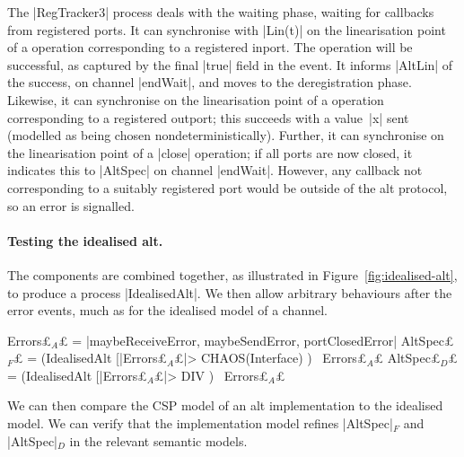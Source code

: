 
The |RegTracker3| process %
deals with the
waiting phase, waiting for callbacks from registered ports.  It can
synchronise with |Lin(t)| on the linearisation point of a 
operation corresponding to a registered inport.  The operation will be
successful, as captured by the final |true| field in the event.  It informs
|AltLin| of the success, on channel |endWait|, and moves to the deregistration
phase.  Likewise, it can synchronise on the linearisation point of a
 operation corresponding to a registered outport; this
succeeds with a value~|x| sent (modelled as being chosen
nondeterministically).  Further, it can synchronise on the linearisation point
of a |close| operation; if all ports are now closed, it indicates this to
|AltSpec| on channel |endWait|.  However, any callback not corresponding to a
suitably registered port would be outside of the alt protocol, so an error is
signalled.


\begin{mysamepage}
\paragraph{Testing the idealised alt.}

The components are combined together, as illustrated in
Figure~\ref{fig:idealised-alt}, to produce a process |IdealisedAlt|.  We
then allow arbitrary behaviours after the error events, much as for the
idealised model of a channel.
%
\begin{cspm}
Errors£$_A$£ = {|maybeReceiveError, maybeSendError, portClosedError|}
AltSpec£$_F$£ = (IdealisedAlt [|Errors£$_A$£|> CHAOS(Interface) ) \ Errors£$_A$£
AltSpec£$_D$£ = (IdealisedAlt [|Errors£$_A$£|> DIV ) \ Errors£$_A$£
\end{cspm}
\end{mysamepage}

We can then compare the CSP model of an alt implementation to the idealised
model.  We can verify that the implementation model refines |AltSpec|$_F$ and
|AltSpec|$_D$ in the relevant semantic models.

